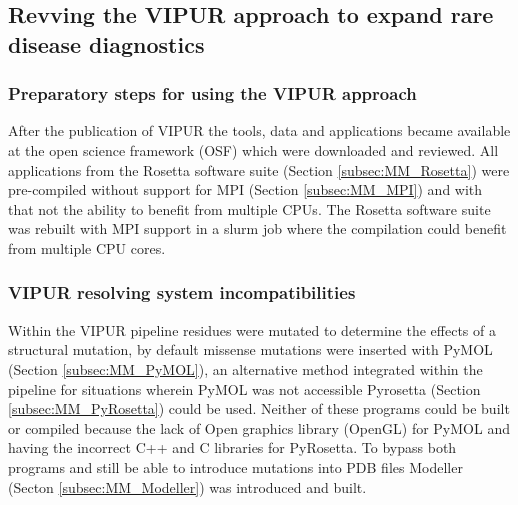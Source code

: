\subsection{Revving the VIPUR approach to expand rare disease diagnostics}
	\subsubsection{Preparatory steps for using the VIPUR approach}
		After the publication of VIPUR the tools, data and applications became available at the open science framework (OSF) \cite{} which were downloaded and reviewed. All applications from the Rosetta software suite (Section \ref{subsec:MM_Rosetta}) were pre-compiled without support for MPI (Section \ref{subsec:MM_MPI}) and with that not the ability to benefit from multiple CPUs. The Rosetta software suite was rebuilt with MPI support in a slurm job where the compilation could benefit from multiple CPU cores.
	\label{subsubsec:RES_Prepare}
	
	\subsubsection{VIPUR resolving system incompatibilities}
	Within the VIPUR pipeline residues were mutated to determine the effects of a structural mutation, by default missense mutations were inserted with PyMOL (Section \ref{subsec:MM_PyMOL}), an alternative method integrated within the pipeline for situations wherein PyMOL was not accessible Pyrosetta (Section \ref{subsec:MM_PyRosetta}) could be used. Neither of these programs could be built or compiled because the lack of Open graphics library (OpenGL) for PyMOL and having the incorrect C++ and C libraries for PyRosetta. To bypass both programs and still be able to introduce mutations into PDB files Modeller (Secton \ref{subsec:MM_Modeller}) was introduced and built.
	
